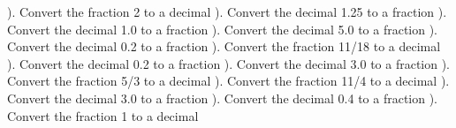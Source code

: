 \documentclass{article}%
\begin{document}
\newline%
\newline%
). Convert the fraction 2 to a decimal%
\newline%
\newline%
). Convert the decimal 1.25 to a fraction%
\newline%
\newline%
). Convert the decimal 1.0 to a fraction%
\newline%
\newline%
). Convert the decimal 5.0 to a fraction%
\newline%
\newline%
). Convert the decimal 0.2 to a fraction%
\newline%
\newline%
). Convert the fraction 11/18 to a decimal%
\newline%
\newline%
). Convert the decimal 0.2 to a fraction%
\newline%
\newline%
). Convert the decimal 3.0 to a fraction%
\newline%
\newline%
). Convert the fraction 5/3 to a decimal%
\newline%
\newline%
). Convert the fraction 11/4 to a decimal%
\newline%
\newline%
). Convert the decimal 3.0 to a fraction%
\newline%
\newline%
). Convert the decimal 0.4 to a fraction%
\newline%
\newline%
). Convert the fraction 1 to a decimal%
\newline%
\newline%
\end{document}
